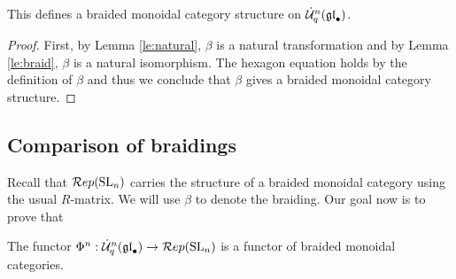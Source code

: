 \documentclass[11pt]{amsart}
\begin{document}
\begin{thm}
This defines a braided monoidal category structure on $ \dot{{\mathcal{U}}}_q^n({\mathfrak{gl}}_\bullet)$.
\end{thm}

\begin{proof}
First, by Lemma \ref{le:natural}, $\beta $ is a natural transformation and by Lemma \ref{le:braid}, $\beta $ is a natural isomorphism.  The hexagon equation holds by the definition of $ \beta $ and thus we conclude that $ \beta $ gives a braided monoidal category structure.
\end{proof}

\subsection{Comparison of braidings}
Recall that $ \mathcal{R}ep({\rm{SL}}_n) $ carries the structure of a braided monoidal category using the usual $R$-matrix.  We will use $ \beta $ to denote the braiding. Our goal now is to prove that
\begin{thm} \label{th:braiding}
The functor $ \Phi^n: \dot{{\mathcal{U}}}_q^n({\mathfrak{gl}}_\bullet) \rightarrow \mathcal{R}ep({\rm{SL}}_n) $ is a functor of braided monoidal categories.
\end{thm}
\end{document}
